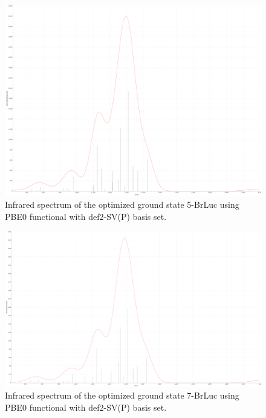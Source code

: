 \documentclass[11pt]{article}
\begin{document}
\begin{figure}[H]
  \centering
  \includegraphics[scale=0.13]{ir_gs_5_brluc.png}
  \caption{Infrared spectrum of the optimized ground state 5-BrLuc
    using PBE0 functional with def2-SV(P) basis set.}
\end{figure}

\begin{figure}[H]
  \centering
  \includegraphics[scale=0.13]{ir_gs_7_brluc.png}
  \caption{Infrared spectrum of the optimized ground state 7-BrLuc
    using PBE0 functional with def2-SV(P) basis set.}
\end{figure}
\end{document}
